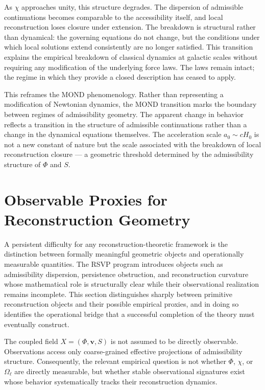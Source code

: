 \documentclass[11pt, a4paper]{article}
\theoremstyle{plain}
\theoremstyle{definition}
\theoremstyle{remark}
\begin{document}
As $\chi$ approaches unity, this structure degrades. The dispersion of admissible
continuations becomes comparable to the accessibility itself, and local reconstruction
loses closure under extension. The breakdown is structural rather than dynamical: the
governing equations do not change, but the conditions under which local solutions
extend consistently are no longer satisfied. This transition explains the empirical
breakdown of classical dynamics at galactic scales without requiring any modification
of the underlying force laws. The laws remain intact; the regime in which they
provide a closed description has ceased to apply.

This reframes the MOND phenomenology. Rather than representing a modification of
Newtonian dynamics, the MOND transition marks the boundary between regimes of
admissibility geometry. The apparent change in behavior reflects a transition in the
structure of admissible continuations rather than a change in the dynamical equations
themselves. The acceleration scale $a_0 \sim cH_0$ is not a new constant of nature
but the scale associated with the breakdown of local reconstruction closure --- a
geometric threshold determined by the admissibility structure of $\Phi$ and $S$.

\section{Observable Proxies for Reconstruction Geometry}
\label{sec:observables}

A persistent difficulty for any reconstruction-theoretic framework is the distinction
between formally meaningful geometric objects and operationally measurable quantities.
The RSVP program introduces objects such as admissibility dispersion, persistence
obstruction, and reconstruction curvature whose mathematical role is structurally
clear while their observational realization remains incomplete. This section
distinguishes sharply between primitive reconstruction objects and their possible
empirical proxies, and in doing so identifies the operational bridge that a successful
completion of the theory must eventually construct.

The coupled field $X = (\Phi, \mathbf{v}, S)$ is not assumed to be directly
observable. Observations access only coarse-grained effective projections of
admissibility structure. Consequently, the relevant empirical question is not whether
$\Phi$, $\chi$, or $\Omega_\ell$ are directly measurable, but whether stable
observational signatures exist whose behavior systematically tracks their
reconstruction dynamics.
\end{document}
